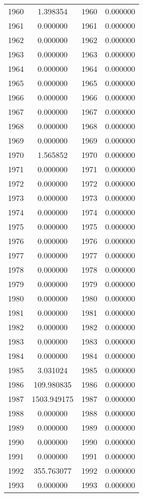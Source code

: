 \documentclass[12pt]{article}
\begin{document}
\begin{longtable}{@{}cccc@{}}
1960 & 1.398354 & 1960 & 0.000000 \\
1961 & 0.000000 & 1961 & 0.000000 \\
1962 & 0.000000 & 1962 & 0.000000 \\
1963 & 0.000000 & 1963 & 0.000000 \\
1964 & 0.000000 & 1964 & 0.000000 \\
1965 & 0.000000 & 1965 & 0.000000 \\
1966 & 0.000000 & 1966 & 0.000000 \\
1967 & 0.000000 & 1967 & 0.000000 \\
1968 & 0.000000 & 1968 & 0.000000 \\
1969 & 0.000000 & 1969 & 0.000000 \\
1970 & 1.565852 & 1970 & 0.000000 \\
1971 & 0.000000 & 1971 & 0.000000 \\
1972 & 0.000000 & 1972 & 0.000000 \\
1973 & 0.000000 & 1973 & 0.000000 \\
1974 & 0.000000 & 1974 & 0.000000 \\
1975 & 0.000000 & 1975 & 0.000000 \\
1976 & 0.000000 & 1976 & 0.000000 \\
1977 & 0.000000 & 1977 & 0.000000 \\
1978 & 0.000000 & 1978 & 0.000000 \\
1979 & 0.000000 & 1979 & 0.000000 \\
1980 & 0.000000 & 1980 & 0.000000 \\
1981 & 0.000000 & 1981 & 0.000000 \\
1982 & 0.000000 & 1982 & 0.000000 \\
1983 & 0.000000 & 1983 & 0.000000 \\
1984 & 0.000000 & 1984 & 0.000000 \\
1985 & 3.031024 & 1985 & 0.000000 \\
1986 & 109.980835 & 1986 & 0.000000 \\
1987 & 1503.949175 & 1987 & 0.000000 \\
1988 & 0.000000 & 1988 & 0.000000 \\
1989 & 0.000000 & 1989 & 0.000000 \\
1990 & 0.000000 & 1990 & 0.000000 \\
1991 & 0.000000 & 1991 & 0.000000 \\
1992 & 355.763077 & 1992 & 0.000000 \\
1993 & 0.000000 & 1993 & 0.000000 \\

\end{longtable}
\end{document}
